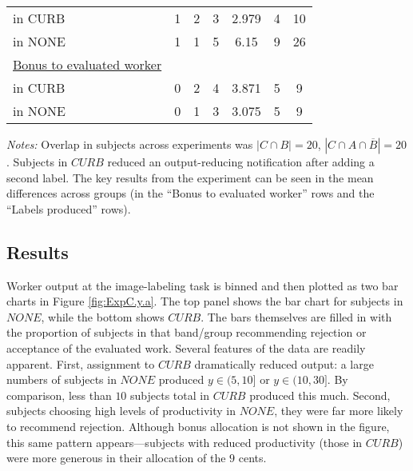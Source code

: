 \documentclass[12pt]{article}
\begin{document}
\begin{table}[h!]
\begin{center}
\begin{tabular}{lcccccc}
   \hspace{10pt} in CURB           & 1 & 2 & 3 & 2.979 & 4 & 10\\
  \hspace{10pt} in NONE            & 1 & 1 & 5 & 6.15 & 9 & 26\\
  \underline{Bonus to evaluated worker} \\
  \hspace{10pt} in CURB     & 0 & 2 & 4 & 3.871 & 5 & 9  \\
  \hspace{10pt} in NONE      & 0 & 1 & 3 & 3.075 & 5 & 9  \\  
  \bottomrule 
  \end{tabular}
\end{center} 
\emph{Notes:} Overlap in subjects across experiments was $|C \cap B| =
20$, $|C \cap A \cap \overline{B}|=20$. Subjects in $CURB$ reduced an
output-reducing notification after adding a second label. The key
results from the experiment can be seen in the mean differences across
groups (in the ``Bonus to evaluated worker'' rows and the ``Labels
produced'' rows).
\end{table} 



\subsection{Results} 
Worker output at the image-labeling task is binned and then plotted as
two bar charts in Figure \ref{fig:ExpC.y.a}. The top panel shows the
bar chart for subjects in $NONE$, while the bottom shows $CURB$.  The
bars themselves are filled in with the proportion of subjects in that
band/group recommending rejection or acceptance of the evaluated
work. Several features of the data are readily apparent. First,
assignment to $CURB$ dramatically reduced output: a large numbers of
subjects in $NONE$ produced $y \in (5,10]$ or $y \in (10,30]$. By
    comparison, less than $10$ subjects total in $CURB$ produced this
    much.  Second, subjects choosing high levels of productivity in
    $NONE$, they were far more likely to recommend rejection. Although
    bonus allocation is not shown in the figure, this same pattern
    appears---subjects with reduced productivity (those in $CURB$) were
    more generous in their allocation of the $9$ cents.
        
\end{document}

